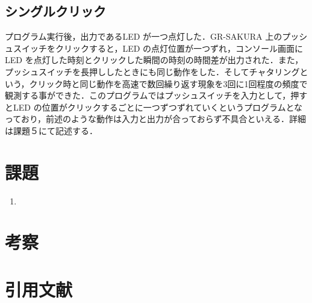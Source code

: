 \documentclass {ujarticle}
\begin{document}
 \subsection{シングルクリック}
 プログラム実行後，出力であるLED が一つ点灯した．GR-SAKURA 上のプッシュスイッチをクリックすると，LED の点灯位置が一つずれ，コンソール画面にLED を点灯した時刻とクリックした瞬間の時刻の時間差が出力された．また，プッシュスイッチを長押ししたときにも同じ動作をした．そしてチャタリングという，クリック時と同じ動作を高速で数回繰り返す現象を3回に1回程度の頻度で観測する事ができた．このプログラムではプッシュスイッチを入力として，押すとLED の位置がクリックするごとに一つずつずれていくというプログラムとなっており，前述のような動作は入力と出力が合っておらず不具合といえる．詳細は課題５にて記述する．
 
 \section{課題}
 
 \begin{enumerate}
 \item 
 
 \end{enumerate}
 \section{考察}
 
 \section{引用文献}
 
 
 
 
 
 
 
 
 
 
 
 
 
 
 
 
 
 
 
 
 
 
 
 
\end{document}
